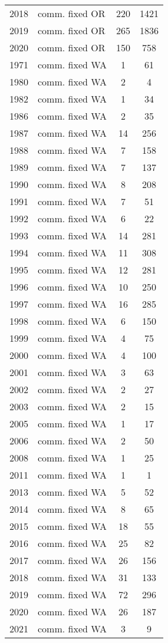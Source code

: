 \begin{longtable}[t]{c>{\centering\arraybackslash}p{4cm}cc}
2018 & comm. fixed OR & 220 & 1421\\
2019 & comm. fixed OR & 265 & 1836\\
2020 & comm. fixed OR & 150 & 758\\
1971 & comm. fixed WA & 1 & 61\\
1980 & comm. fixed WA & 2 & 4\\
1982 & comm. fixed WA & 1 & 34\\
1986 & comm. fixed WA & 2 & 35\\
1987 & comm. fixed WA & 14 & 256\\
1988 & comm. fixed WA & 7 & 158\\
1989 & comm. fixed WA & 7 & 137\\
1990 & comm. fixed WA & 8 & 208\\
1991 & comm. fixed WA & 7 & 51\\
1992 & comm. fixed WA & 6 & 22\\
1993 & comm. fixed WA & 14 & 281\\
1994 & comm. fixed WA & 11 & 308\\
1995 & comm. fixed WA & 12 & 281\\
1996 & comm. fixed WA & 10 & 250\\
1997 & comm. fixed WA & 16 & 285\\
1998 & comm. fixed WA & 6 & 150\\
1999 & comm. fixed WA & 4 & 75\\
2000 & comm. fixed WA & 4 & 100\\
2001 & comm. fixed WA & 3 & 63\\
2002 & comm. fixed WA & 2 & 27\\
2003 & comm. fixed WA & 2 & 15\\
2005 & comm. fixed WA & 1 & 17\\
2006 & comm. fixed WA & 2 & 50\\
2008 & comm. fixed WA & 1 & 25\\
2011 & comm. fixed WA & 1 & 1\\
2013 & comm. fixed WA & 5 & 52\\
2014 & comm. fixed WA & 8 & 65\\
2015 & comm. fixed WA & 18 & 55\\
2016 & comm. fixed WA & 25 & 82\\
2017 & comm. fixed WA & 26 & 156\\
2018 & comm. fixed WA & 31 & 133\\
2019 & comm. fixed WA & 72 & 296\\
2020 & comm. fixed WA & 26 & 187\\
2021 & comm. fixed WA & 3 & 9\\*
\end{longtable}
\endgroup{}
\endgroup{}
